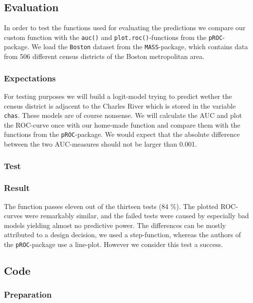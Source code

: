 \documentclass{article}
\begin{document}
\subsection{Evaluation}

In order to test the functions used for evaluating the predictions we compare our custom function with the \texttt{auc()} and \texttt{plot.roc()}-functions from the \texttt{pROC}-package. We load the \texttt{Boston} dataset from the \texttt{MASS}-package, which contains data from 506 different census districts of the Boston metropolitan area. 

\subsubsection{Expectations}
For testing purposes we will build a logit-model trying to predict wether the census district is adjacent to the Charles River which is stored in the variable \texttt{chas}. These models are of course nonsense. We will calculate the AUC and plot the ROC-curve once with our home-made function and compare them with the functions from the \texttt{pROC}-package. We would expect that the absolute difference between the two AUC-measures should not be larger than 0.001.

\subsubsection{Test}


\subsubsection{Result}
The function passes eleven out of the thirteen tests (84 \%). The plotted ROC-curves were remarkably similar, and the failed tests were caused by especially bad models yielding almost no predictive power. The differences can be mostly attributed to a design decision, we used a step-function, whereas the authors of the \texttt{pROC}-package use a line-plot. However we consider this test a success.
\newpage

\subsection{Code}
\subsubsection{Preparation}

\end{document}
